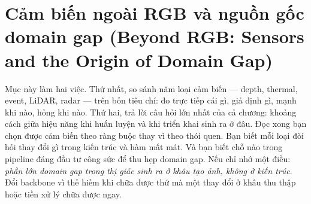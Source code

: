 \documentclass[../../../deep_learning.tex]{subfiles}
\begin{document}
\section{Cảm biến ngoài RGB và nguồn gốc domain gap (Beyond RGB: Sensors and the Origin of Domain Gap)}

\begin{tomtat}
Mục này làm hai việc. Thứ nhất, so sánh năm loại cảm biến --- depth, thermal, event, LiDAR, radar --- trên bốn tiêu chí: đo trực tiếp cái gì, giả định gì, mạnh khi nào, hỏng khi nào. Thứ hai, trả lời câu hỏi lớn nhất của cả chương: khoảng cách giữa hiệu năng khi huấn luyện và khi triển khai sinh ra ở đâu. Đọc xong bạn chọn được cảm biến theo ràng buộc thay vì theo thói quen. Bạn biết mỗi loại đòi hỏi thay đổi gì trong kiến trúc và hàm mất mát. Và bạn biết chỗ nào trong pipeline đáng đầu tư công sức để thu hẹp domain gap. Nếu chỉ nhớ một điều: \emph{phần lớn domain gap trong thị giác sinh ra ở khâu tạo ảnh, không ở kiến trúc}. Đổi backbone vì thế hiếm khi chữa được thứ mà một thay đổi ở khâu thu thập hoặc tiền xử lý chữa được ngay.
\end{tomtat}
\end{document}
